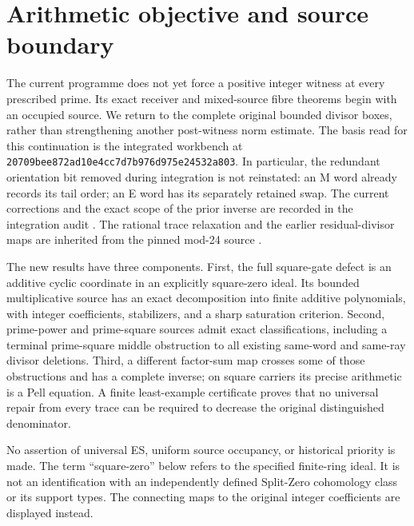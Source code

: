 \section{Arithmetic objective and source boundary}
The current programme does not yet force a positive integer witness at every
prescribed prime. Its exact receiver and mixed-source fibre theorems begin
with an occupied source. We return to the complete original bounded divisor
boxes, rather than strengthening another post-witness norm estimate.
The basis read for this continuation is the integrated workbench at
\texttt{20709bee872ad10e4cc7d7b976d975e24532a803}. In particular, the redundant
orientation bit removed during integration is not reinstated: an M word
already records its tail order; an E word has its separately retained swap.
The current corrections and the exact scope of the prior inverse are
recorded in the integration audit \citep{Integrated}. The rational trace
relaxation and the earlier residual-divisor maps are inherited from the
pinned mod-24 source \citep[\S\S2--3]{Trace}.

The new results have three components. First, the full square-gate defect is
an additive cyclic coordinate in an explicitly square-zero ideal. Its bounded
multiplicative source has an exact decomposition into finite additive
polynomials, with integer coefficients, stabilizers, and a sharp saturation
criterion. Second, prime-power and prime-square sources admit exact
classifications, including a terminal prime-square middle obstruction to
all existing same-word and same-ray divisor deletions. Third, a different
factor-sum map crosses some of those obstructions and has a complete inverse;
on square carriers its precise arithmetic is a Pell equation. A finite
least-example certificate proves that no universal repair from every trace
can be required to decrease the original distinguished denominator.

No assertion of universal ES, uniform source occupancy, or historical priority
is made. The term ``square-zero'' below refers to the specified finite-ring
ideal. It is not an identification with an independently defined Split-Zero
cohomology class or its support types. The connecting maps to the original
integer coefficients are displayed instead.


